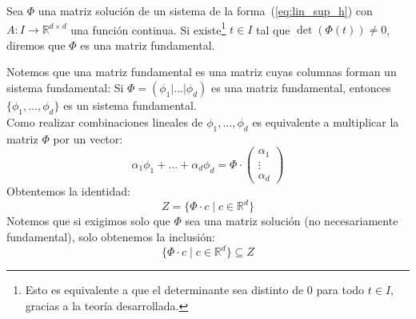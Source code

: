 \begin{definicion}
    Sea $\Phi$ una matriz solución de un sistema de la forma~(\ref{eq:lin_sup_h}) con $A:I\rightarrow\mathbb{R}^{d\times d}$ una función continua. Si existe\footnote{Esto es equivalente a que el determinante sea distinto de 0 para todo $t\in I$, gracias a la teoría desarrollada.} $t\in I$ tal que $\det(\Phi(t)) \neq 0$, diremos que $\Phi$ es una matriz fundamental.
\end{definicion}

\begin{observacion}
    Notemos que una matriz fundamental es una matriz cuyas columnas forman un sistema fundamental: Si $\Phi=(\phi_1|\ldots|\phi_d)$ es una matriz fundamental, entonces $\{\phi_1,\ldots,\phi_d\}$ es un sistema fundamental.\\

    \noindent
    Como realizar combinaciones lineales de $\phi_1,\ldots,\phi_d$ es equivalente a multiplicar la matriz $\Phi$ por un vector:
    \begin{equation*}
        \alpha_1 \phi_1 + \ldots + \alpha_d \phi_d = \Phi\cdot 
        \left(\begin{array}{c}
            \alpha_1 \\
            \vdots \\
            \alpha_d
        \end{array}\right)
    \end{equation*}
    Obtentemos la identidad:
    \begin{equation*}
        Z = \{\Phi\cdot c \mid c\in \mathbb{R}^d\}
    \end{equation*}
    Notemos que si exigimos solo que $\Phi$ sea una matriz solución (no necesariamente fundamental), solo obtenemos la inclusión:
    \begin{equation*}
        \{\Phi\cdot c \mid c\in \mathbb{R}^d\} \subseteq Z
    \end{equation*}
\end{observacion}

